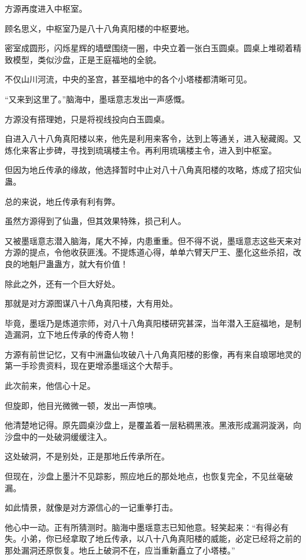 
\begin{this_body}



方源再度进入中枢室。

顾名思义，中枢室乃是八十八角真阳楼的中枢要地。

密室成圆形，闪烁星辉的墙壁围绕一圈，中央立着一张白玉圆桌。圆桌上堆砌着精致模型，类似沙盘，正是王庭福地的全貌。

不仅山川河流，中央的圣宫，甚至福地中的各个小塔楼都清晰可见。

“又来到这里了。”脑海中，墨瑶意志发出一声感慨。

方源没有搭理她，只是将视线投向白玉圆桌。

自进入八十八角真阳楼以来，他先是利用来客令，达到上等通关，进入秘藏阁。又炼化来客止步碑，寻找到琉璃楼主令。再利用琉璃楼主令，进入到中枢室。

但因为地丘传承的缘故，他选择暂时中止对八十八角真阳楼的攻略，炼成了招灾仙蛊。

总的来说，地丘传承有利有弊。

虽然方源得到了仙蛊，但其效果特殊，损己利人。

又被墨瑶意志潜入脑海，尾大不掉，内患重重。但不得不说，墨瑶意志这些天来对方源的提点，令他收获匪浅。不提炼道心得，单单六臂天尸王、墨化这些杀招，改良的地魁尸蛊蛊方，就大有价值！

除此之外，还有一个巨大好处。

那就是对方源图谋八十八角真阳楼，大有用处。

毕竟，墨瑶乃是炼道宗师，对八十八角真阳楼研究甚深，当年潜入王庭福地，是制造漏洞，立下地丘传承的传奇人物！

方源有前世记忆，又有中洲蛊仙攻破八十八角真阳楼的影像，再有来自琅琊地灵的第一手珍贵资料，现在更增添墨瑶这个大帮手。

此次前来，他信心十足。

但旋即，他目光微微一顿，发出一声惊咦。

他清楚地记得。原先圆桌沙盘上，是覆盖着一层粘稠黑液。黑液形成漏洞漩涡，向沙盘中的一处破洞缓缓注入。

这处破洞，不是别处，正是那地丘传承所在。

但现在，沙盘上墨汁不见踪影，照应地丘的那处地点，也恢复完全，不见丝毫破漏。

如此情景，就像是对方源信心的一记重拳打击。

他心中一动。正有所猜测时。脑海中墨瑶意志已知他意。轻笑起来：“有得必有失。小弟，你已经拿取了地丘传承，以八十八角真阳楼的威能，必定已经将之前的那处漏洞还原恢复。地丘上破洞不在，应当重新矗立了小塔楼。”


\end{this_body}
